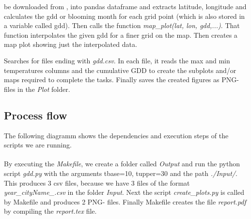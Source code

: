 \documentclass[12pt]{article}
\begin{document}
\begin{description}
\begin{itemize}
be downloaded from \cite{gridTemp}, into pandas dataframe and extracts latitude, 
longitude and calculates the gdd or blooming month for each grid point 
(which is also stored in a variable called gdd).
Then calls the function \emph{map\_plot(lat, lon, gdd,...)}. That function
interpolates the given gdd for a finer grid on the map. Then creates a map plot
showing just the interpolated data.
\end{itemize} 
\item Searches for files ending with \emph{gdd.csv}. 
In each file, it reads the max and min temperatures columns and the cumulative 
GDD to create the subplots and/or maps required to complete the tasks. 
Finally saves the created figures as PNG-files in the \emph{Plot} folder.

\end{description}
\subsection{Process flow}
The following diagramm shows the dependencies and execution steps of the scripts
we are running.
\\~\\
By executing the \emph{Makefile}, we create a folder called \emph{Output} and run
the python script \emph{gdd.py} with the arguments tbase=10, tupper=30 and the path
 \emph{./Input/}. This produces 3 csv files, because we have 3 files of the 
format \emph{year\_cityName\_.csv} in the folder \emph{Input}.
Next the script \emph{create\_plots.py} is called by Makefile and produces 2 PNG-
files. Finally Makefile creates the file \emph{report.pdf} by compiling the 
\emph{report.tex} file.
\end{document}
